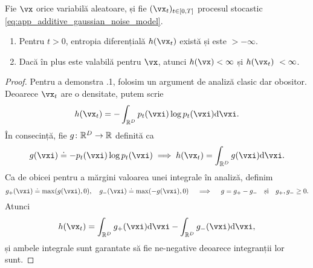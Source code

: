 \documentclass[../../book-main_ro.tex]{subfiles}
\begin{document}
\begin{lemma}\label{lem:diffusion_entropy_exists}
    Fie \(\vx\) orice variabilă aleatoare, și fie \((\vx_{t})_{t \in [0, T]}\) procesul stocastic \eqref{eq:app_additive_gaussian_noise_model}. 
    \begin{enumerate}
        \item Pentru \(t > 0\), entropia diferențială \(h(\vx_{t})\) există și este \(> -\infty\).
        \item Dacă în plus  este valabilă pentru \(\vx\), atunci \(h(\vx) < \infty\) și \(h(\vx_{t})\ < \infty\).
    \end{enumerate}
\end{lemma}
\begin{proof}
    Pentru a demonstra .1, folosim un argument de analiză clasic dar obositor. Deoarece \(\vx_{t}\) are o densitate, putem scrie 
    \begin{equation}
        h(\vx_{t}) = -\int_{\R^{D}}p_{t}(\vxi)\log p_{t}(\vxi) \odif{\vxi}.
    \end{equation}
    În consecință, fie \(g \colon \mathbb{R}^{D} \to \mathbb{R}\) definită ca 
    \begin{equation}
        g(\vxi) \doteq -p_{t}(\vxi)\log p_{t}(\vxi) \implies h(\vx_{t}) = \int_{\R^{D}}g(\vxi)\odif{\vxi}.
    \end{equation}
    Ca de obicei pentru a mărgini valoarea unei integrale în analiză, definim 
    \begin{equation}
        g_{+}(\vxi) \doteq \max(g(\vxi), 0), \quad g_{-}(\vxi) \doteq \max(-g(\vxi), 0) \quad \implies \quad g = g_{+} - g_{-}\quad \text{și} \quad g_{+}, g_{-} \geq 0.
    \end{equation}
    Atunci 
    \begin{equation}
        h(\vx_{t}) = \int_{\R^{D}}g_{+}(\vxi)\odif{\vxi} - \int_{\R^{D}}g_{-}(\vxi)\odif{\vxi},
    \end{equation}
    și ambele integrale sunt garantate să fie ne-negative deoarece integranții lor sunt. 
    

\end{proof}
\end{document}
